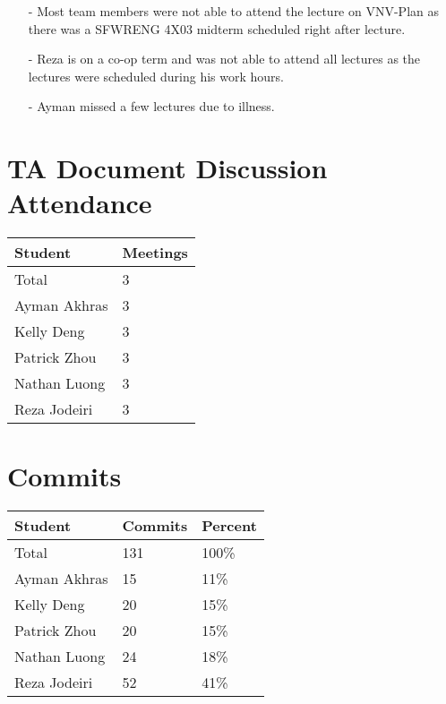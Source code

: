 \documentclass{article}
\begin{document}
\begin{itemize}
    \item[-] Most team members were not able to attend the lecture on VNV-Plan as there was a SFWRENG 4X03 midterm scheduled right after lecture.
    \item[-] Reza is on a co-op term and was not able to attend all lectures as the lectures were scheduled during his work hours.
    \item[-] Ayman missed a few lectures due to illness.
\end{itemize}

\section{TA Document Discussion Attendance}

\begin{table}[H]
    \centering
    \begin{tabular}{ll}
    \toprule
    \textbf{Student} & \textbf{Meetings}\\
    \midrule
    Total & 3\\
    Ayman Akhras & 3\\
    Kelly Deng & 3\\
    Patrick Zhou  & 3\\
    Nathan Luong & 3\\
    Reza Jodeiri& 3\\
    \bottomrule
    \end{tabular}
    \end{table}

\section{Commits}

\begin{table}[H]
\centering
\begin{tabular}{lll}
\toprule
\textbf{Student} & \textbf{Commits} & \textbf{Percent}\\
\midrule
Total & 131 & 100\% \\
Ayman Akhras & 15 & 11\% \\
Kelly Deng & 20 & 15\% \\
Patrick Zhou & 20 & 15\% \\
Nathan Luong & 24 & 18\% \\
Reza Jodeiri & 52 & 41\% \\
\bottomrule
\end{tabular}
\end{table}
\end{document}
